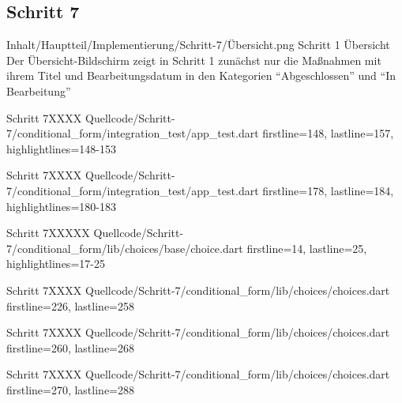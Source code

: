 \clearpage 

\subsection{Schritt 7}

\begin{alexfigure}{Inhalt/Hauptteil/Implementierung/Schritt-7/Übersicht.png}
  {Schritt 1 Übersicht}
  {Der Übersicht-Bildschirm zeigt in  Schritt 1 zunächst nur die Maßnahmen mit ihrem Titel und Bearbeitungsdatum in den Kategorien \enquote{Abgeschlossen} und \enquote{In Bearbeitung}}

  \label{fig:Schritt1Uebersicht}

\end{alexfigure}

\clearpage 


\begin{alexlisting}{Schritt 7}{XXXX}
    {Quellcode/Schritt-7/conditional_form/integration_test/app_test.dart}
    {firstline=148, lastline=157, highlightlines={148-153}}
    \label{lst:Schritt5XXXX}
  \end{alexlisting}

  \begin{alexlisting}{Schritt 7}{XXXX}
    {Quellcode/Schritt-7/conditional_form/integration_test/app_test.dart}
    {firstline=178, lastline=184, highlightlines={180-183}}
    \label{lst:Schritt5XXXX}
  \end{alexlisting}


  \begin{alexlisting}{Schritt 7}{XXXXX}
    {Quellcode/Schritt-7/conditional_form/lib/choices/base/choice.dart}
    {firstline=14, lastline=25, highlightlines={17-25}}
    \label{lst:Schritt4XXXXX}
  \end{alexlisting}

  \begin{alexlisting}{Schritt 7}{XXXX}
    {Quellcode/Schritt-7/conditional_form/lib/choices/choices.dart}
    {firstline=226, lastline=258}
    \label{lst:Schritt5XXXX}
  \end{alexlisting}

  \begin{alexlisting}{Schritt 7}{XXXX}
    {Quellcode/Schritt-7/conditional_form/lib/choices/choices.dart}
    {firstline=260, lastline=268}
    \label{lst:Schritt5XXXX}
  \end{alexlisting}

  \begin{alexlisting}{Schritt 7}{XXXX}
    {Quellcode/Schritt-7/conditional_form/lib/choices/choices.dart}
    {firstline=270, lastline=288}
    \label{lst:Schritt5XXXX}
  \end{alexlisting}

